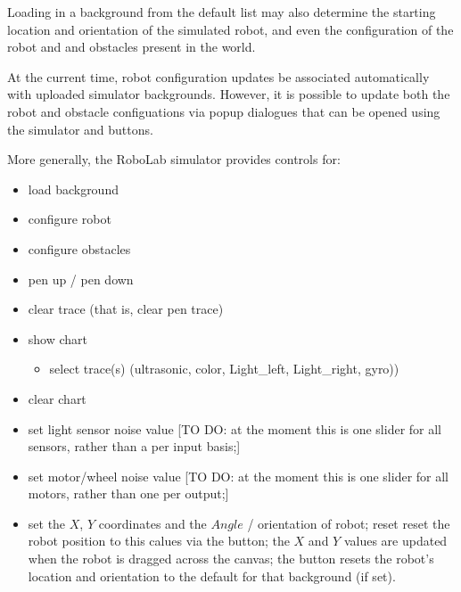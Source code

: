\documentclass[letterpaper,10pt,english]{sphinxmanual}
\begin{document}
{Loading in a background from the default list may also determine the starting location and orientation of the simulated robot, and even the configuration of the robot and and obstacles present in the world.

At the current time, robot configuration updates  be associated automatically with uploaded simulator backgrounds. However, it is possible to update both the robot and obstacle configuations via pop\sphinxhyphen{}up dialogues that can be opened using the simulator  and  buttons.

More generally, the RoboLab simulator provides controls for:
\begin{itemize}
\item {} 
load background

\item {} 
configure robot

\item {} 
configure obstacles

\item {} 
pen up / pen down

\item {} 
clear trace (that is, clear pen trace)

\item {} 
show chart
\begin{itemize}
\item {} 
select trace(s) (ultrasonic, color, Light\_left, Light\_right, gyro))

\end{itemize}

\item {} 
clear chart

\item {} 
set light sensor noise value {[}TO DO: at the moment this is one slider for all sensors, rather than a per input basis;{]}

\item {} 
set motor/wheel noise value {[}TO DO: at the moment this is one slider for all motors, rather than one per output;{]}

\item {} 
set the \(X\), \(Y\) co\sphinxhyphen{}ordinates and the \(Angle\) / orientation of robot; reset reset the robot position to this calues via the  button; the \(X\) and \(Y\) values are updated when the robot is dragged across the canvas; the  button resets the robot’s location and orientation to the default for that background (if set).


\end{itemize}}
\end{document}
